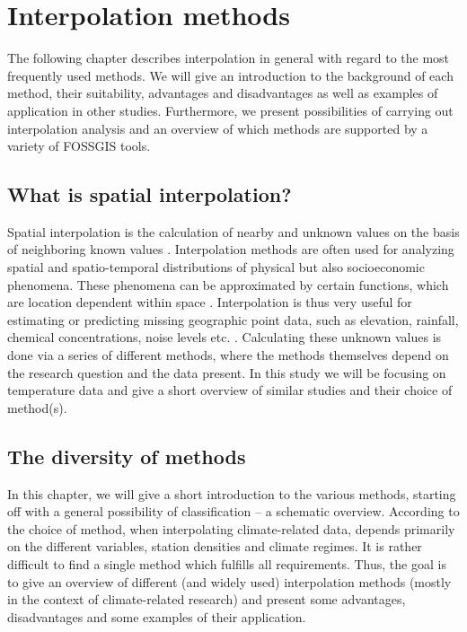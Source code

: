 
\section{Interpolation methods}

The following chapter describes interpolation in general with regard to the most frequently used methods. We will give an introduction to the background of each method, their suitability, advantages and disadvantages as well as examples of application in other studies. Furthermore, we present possibilities of carrying out interpolation analysis and an overview of which methods are supported by a variety of FOSSGIS tools.

\subsection{What is spatial interpolation?}

Spatial interpolation is the calculation of nearby and unknown values on the basis of neighboring known values \cite{gitta_raumliche_2016}. Interpolation methods are often used for analyzing spatial and spatio-temporal distributions of physical but also socioeconomic phenomena. These phenomena can be approximated by certain functions, which are location dependent within space \cite{mitas_spatial_1999}. Interpolation is thus very useful for estimating or predicting missing geographic point data, such as elevation, rainfall, chemical concentrations, noise levels etc. \cite{samanta_interpolation_2012}. Calculating these unknown values is done via a series of different methods, where the methods themselves depend on the research question and the data present. In this study we will be focusing on temperature data and give a short overview of similar studies and their choice of method(s).

\subsection{The diversity of methods}

In this chapter, we will give a short introduction to the various methods, starting off with a general possibility of classification – a schematic overview. According to \citeauthor{hofstra_comparison_2008} the choice of method, when interpolating climate-related data, depends primarily on the different variables, station densities and climate regimes. It is rather difficult to find a single method which fulfills all requirements. Thus, the goal is to give an overview of different (and widely used) interpolation methods (mostly in the context of climate-related research) and present some advantages, disadvantages and some examples of their application.

